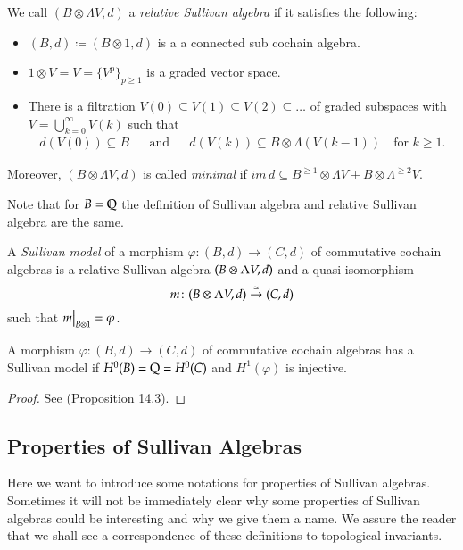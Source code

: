 \begin{Definition}
 We call $(B \otimes \Lambda V,d)$ a \emph{relative Sullivan algebra} if it satisfies the following:
 
 \begin{itemize}
  \item $(B,d) \coloneqq (B \otimes 1, d)$ is a a connected sub cochain algebra.
  \item $1 \otimes V = V = { \lbrace V^p \rbrace}_{ p \geq 1}$ is a graded vector space.
  \item There is a filtration $V(0) \subseteq V(1) \subseteq V(2) \subseteq \ldots$ of graded subspaces
    with  $ V = \bigcup_{k = 0}^{\infty} V(k)$ such that 
    \begin{align*}
     d(V(0)) \subseteq B &  & \text{and} & & d(V(k)) \subseteq B \otimes \Lambda (V(k-1)) \quad \text{for $k \geq 1$.}
    \end{align*}
 \end{itemize}
 Moreover, $(B \otimes \Lambda V,d)$ is called \emph{minimal} if 
 $im \, d \subseteq B^{\geq 1} \otimes \Lambda V + B \otimes \Lambda^{\geq 2} V$.
\end{Definition}

\begin{Remark}
 Note that for $B = \mathbb{Q}$ the definition of Sullivan algebra and relative Sullivan algebra are the same.
\end{Remark}

\begin{Definition}

 A \emph{Sullivan model} of a morphism $\varphi \colon (B,d) \to (C,d)$ of commutative cochain algebras is
 a relative Sullivan algebra $(B \otimes \Lambda V,d)$ and a quasi-isomorphism
 $$ m \colon (B \otimes \Lambda V,d) \overset{\simeq}{\to} (C,d) $$
 such that $\restr{m}{B \otimes 1} = \varphi$.
\end{Definition}

\begin{Proposition}
\label{prop:ExistenceMorphismSullivanModels}
 A morphism $\varphi \colon (B,d) \to (C,d)$ of commutative cochain algebras has a Sullivan model
 if $H^0(B) = \mathbb{Q} = H^0(C)$ and $H^1(\varphi)$ is injective.
\end{Proposition}
\begin{proof}
 See \cite{Felix2001} (Proposition 14.3).
\end{proof}

\subsection{Properties of Sullivan Algebras}
Here we want to introduce some notations for properties of Sullivan algebras. Sometimes it will not be
immediately clear why some properties of Sullivan algebras could be interesting and why we give them a name. We assure
the reader that we shall see a correspondence of these definitions to topological invariants.


